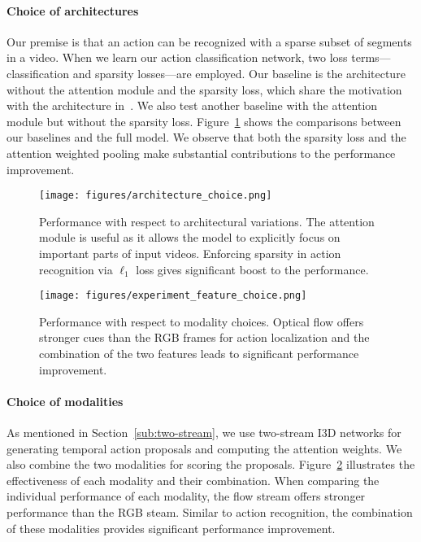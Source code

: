 \documentclass[10pt,twocolumn,letterpaper]{article}
\begin{document}
\paragraph{Choice of architectures}
Our premise is that an action can be recognized with a sparse subset of segments in a video. When we learn our action classification network, two loss terms---classification and sparsity losses---are employed.
Our baseline is the architecture without the attention module and the sparsity loss, which share the motivation with the architecture in~\cite{zhou16learning}. 
We also test another baseline with the attention module but without the sparsity loss.
Figure~\ref{fig:experiment_architecture_choice} shows the comparisons between our baselines and the full model. 
We observe that both the sparsity loss and the attention weighted pooling make substantial contributions to the performance improvement.
\begin{figure}[t]
\captionsetup{font=small}
\centering
\texttt{[image: figures/architecture\_choice.png]}\\
\vspace{-0.1cm}
    \caption{Performance with respect to architectural variations. The attention module is useful as it allows the model to explicitly focus on important parts of input videos.  Enforcing sparsity in action recognition via $\ell_1$ loss gives significant boost to the performance.}
\label{fig:experiment_architecture_choice}
\end{figure}

\begin{figure}[t]
\captionsetup{font=small}
\centering
\texttt{[image: figures/experiment\_feature\_choice.png]}\\
\vspace{-0.1cm}
    \caption{Performance with respect to modality choices. Optical flow offers stronger cues than the RGB frames for action localization and the combination of the two features leads to significant performance improvement.}
\label{fig:experiment_feature_choice}
\end{figure}

\paragraph{Choice of modalities} 
As mentioned in Section~\ref{sub:two-stream}, we use two-stream I3D networks for generating temporal action proposals and computing the attention weights. We also combine the two modalities for scoring the proposals.
Figure~\ref{fig:experiment_feature_choice} illustrates the effectiveness of each modality and their combination. 
When comparing the individual performance of each modality, the flow stream offers stronger performance than the RGB steam.
Similar to action recognition, the combination of these modalities provides significant performance improvement.
\end{document}
